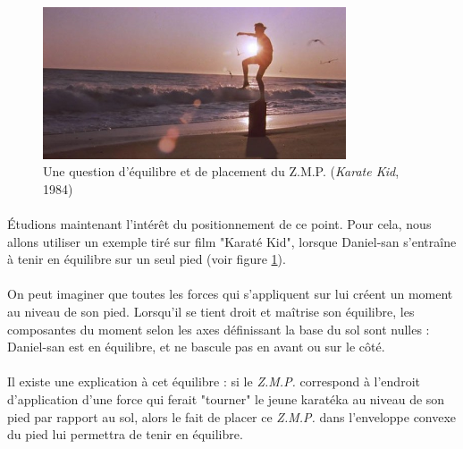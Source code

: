 \documentclass[a4paper,10pt]{article}
\begin{document}
            \begin{figure}[h!]
                \centering
                \includegraphics[width=0.8\textwidth]{karate_kid_1984.jpg}
                \caption{Une question d'équilibre et de placement du Z.M.P. (\textit{Karate Kid}, 1984)}
                \label{fig:danielsan}
            \end{figure}
                
                
            \paragraph{}
                Étudions maintenant l'intérêt du positionnement de ce point. Pour cela, nous allons utiliser
                un exemple tiré sur film "Karaté Kid", lorsque Daniel-san s'entraîne à tenir en équilibre sur 
                un seul pied (voir figure \ref{fig:danielsan}). 
                

            \paragraph{}
                On peut imaginer que toutes les forces qui s'appliquent sur lui 
                créent un moment au niveau de son pied. Lorsqu'il se tient droit et maîtrise son 
                équilibre, les composantes du moment selon les axes définissant la base du sol 
                sont nulles : Daniel-san est en équilibre, et ne bascule pas en avant ou sur le côté. 
                
            \paragraph{}
                Il existe une explication à cet équilibre : si le \textit{Z.M.P.} correspond à 
                l'endroit d'application d'une force qui ferait "tourner" le jeune karatéka au niveau 
                de son pied par rapport au sol, alors le fait de placer ce \textit{Z.M.P.} dans 
                l'enveloppe convexe du pied lui permettra de tenir en équilibre. 
                
\end{document}
